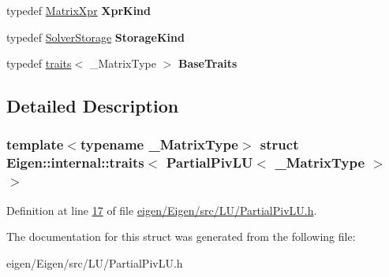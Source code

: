 \begin{DoxyCompactItemize}
typedef \hyperlink{struct_eigen_1_1_matrix_xpr}{Matrix\+Xpr} {\bfseries Xpr\+Kind}
\item 
\mbox{\label{struct_eigen_1_1internal_1_1traits_3_01_partial_piv_l_u_3_01___matrix_type_01_4_01_4_a69d58e3e3f7626479141d277d46fbf18}} 
typedef \hyperlink{struct_eigen_1_1_solver_storage}{Solver\+Storage} {\bfseries Storage\+Kind}
\item 
\mbox{\label{struct_eigen_1_1internal_1_1traits_3_01_partial_piv_l_u_3_01___matrix_type_01_4_01_4_ac19dabf2a52fcbe37f8fd6ba52799704}} 
typedef \hyperlink{struct_eigen_1_1internal_1_1traits}{traits}$<$ \+\_\+\+Matrix\+Type $>$ {\bfseries Base\+Traits}
\end{DoxyCompactItemize}


\subsection{Detailed Description}
\subsubsection*{template$<$typename \+\_\+\+Matrix\+Type$>$\newline
struct Eigen\+::internal\+::traits$<$ Partial\+Piv\+L\+U$<$ \+\_\+\+Matrix\+Type $>$ $>$}



Definition at line \hyperlink{eigen_2_eigen_2src_2_l_u_2_partial_piv_l_u_8h_source_l00017}{17} of file \hyperlink{eigen_2_eigen_2src_2_l_u_2_partial_piv_l_u_8h_source}{eigen/\+Eigen/src/\+L\+U/\+Partial\+Piv\+L\+U.\+h}.



The documentation for this struct was generated from the following file\+:\begin{DoxyCompactItemize}
\item 
eigen/\+Eigen/src/\+L\+U/\+Partial\+Piv\+L\+U.\+h\end{DoxyCompactItemize}
